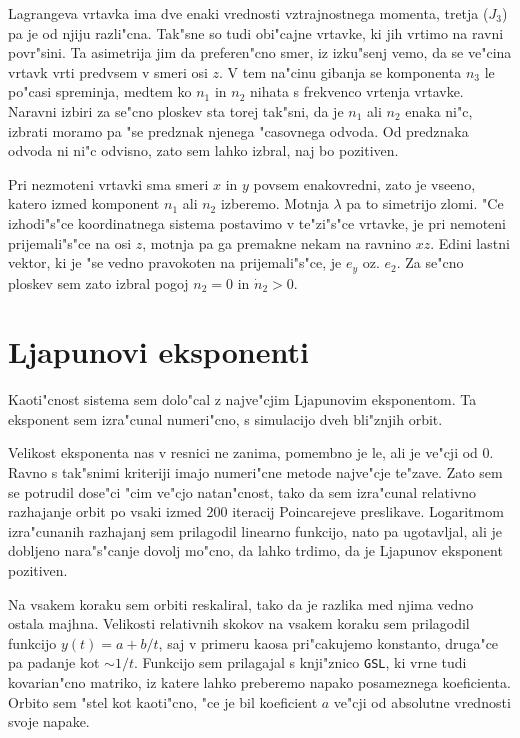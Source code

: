 \documentclass[a4paper,10pt]{article}
\begin{document}
Lagrangeva vrtavka ima dve enaki vrednosti vztrajnostnega momenta, tretja ($J_3$) pa je od njiju razli"cna. Tak"sne so tudi obi"cajne vrtavke, ki jih vrtimo na ravni povr"sini. Ta asimetrija jim da preferen"cno smer, iz izku"senj vemo, da se ve"cina vrtavk vrti predvsem v smeri osi $z$. V tem na"cinu gibanja se komponenta $n_3$ le po"casi spreminja, medtem ko $n_1$ in $n_2$ nihata s frekvenco vrtenja vrtavke. Naravni izbiri za se"cno ploskev sta torej tak"sni, da je $n_1$ ali $n_2$ enaka ni"c, izbrati moramo pa "se predznak njenega "casovnega odvoda. Od predznaka odvoda ni ni"c odvisno, zato sem lahko izbral, naj bo pozitiven. 

Pri nezmoteni vrtavki sma smeri $x$ in $y$ povsem enakovredni, zato je vseeno, katero izmed komponent $n_1$ ali $n_2$ izberemo. Motnja $\lambda$ pa to simetrijo zlomi. "Ce izhodi"s"ce koordinatnega sistema postavimo v te"zi"s"ce vrtavke, je pri nemoteni prijemali"s"ce na osi $z$, motnja pa ga premakne nekam na ravnino $xz$. Edini lastni vektor, ki je "se vedno pravokoten na prijemali"s"ce, je $e_y$ oz. $e_2$. Za se"cno ploskev sem zato izbral pogoj $n_2 = 0$ in $\dot n_2 > 0$. 

\section{Ljapunovi eksponenti}

Kaoti"cnost sistema sem dolo"cal z najve"cjim Ljapunovim eksponentom. Ta eksponent sem izra"cunal numeri"cno, s simulacijo dveh bli"znjih orbit. 

Velikost eksponenta nas v resnici ne zanima, pomembno je le, ali je ve"cji od 0. Ravno s tak"snimi kriteriji imajo numeri"cne metode najve"cje te"zave. Zato sem se potrudil dose"ci "cim ve"cjo natan"cnost, tako da sem izra"cunal relativno razhajanje orbit po vsaki izmed 200 iteracij Poincarejeve preslikave. Logaritmom izra"cunanih razhajanj sem prilagodil linearno funkcijo, nato pa ugotavljal, ali je dobljeno nara"s"canje dovolj mo"cno, da lahko trdimo, da je Ljapunov eksponent pozitiven. 

Na vsakem koraku sem orbiti reskaliral, tako da je razlika med njima vedno ostala majhna. Velikosti relativnih skokov na vsakem koraku sem prilagodil funkcijo $y(t) = a+b/t$, saj v primeru kaosa pri"cakujemo konstanto, druga"ce pa padanje kot $\sim 1/t$. Funkcijo sem prilagajal s knji"znico \texttt{GSL}, ki vrne tudi kovarian"cno matriko, iz katere lahko preberemo napako posameznega koeficienta. Orbito sem "stel kot kaoti"cno, "ce je bil koeficient $a$ ve"cji od absolutne vrednosti svoje napake. 
\end{document}
